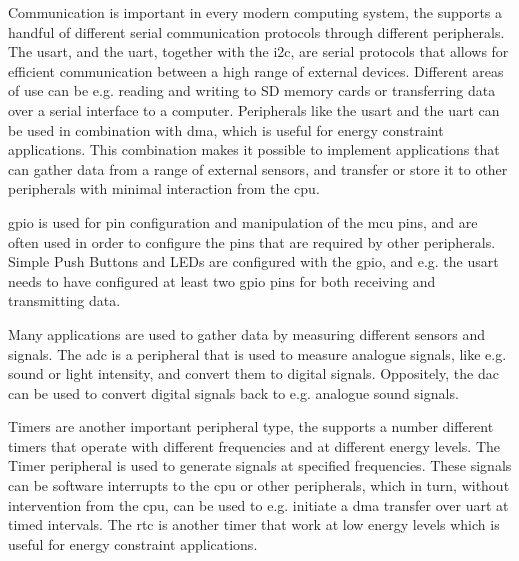 Communication is important in every modern computing system, the {\gecko} supports a handful of different serial communication protocols through different peripherals.
The \gls{usart}, and the \gls{uart}, together with the \gls{i2c}, are serial protocols that allows for efficient communication between a high range of external devices.
Different areas of use can be e.g. reading and writing to SD memory cards or transferring data over a serial interface to a computer.
Peripherals like the \gls{usart} and the \gls{uart} can be used in combination with \gls{dma}, which is useful for energy constraint applications.
This combination makes it possible to implement applications that can gather data from a range of external sensors, and transfer or store it to other peripherals with minimal interaction from the \gls{cpu}.

\gls{gpio} is used for pin configuration and manipulation of the \gls{mcu} pins, and are often used in order to configure the pins that are required by other peripherals.
Simple Push Buttons and LEDs are configured with the \gls{gpio}, and e.g. the \gls{usart} needs to have configured at least two \gls{gpio} pins for both receiving and transmitting data.

Many applications are used to gather data by measuring different sensors and signals.
The \gls{adc} is a peripheral that is used to measure analogue signals, like e.g. sound or light intensity, and convert them to digital signals.
Oppositely, the \gls{dac} can be used to convert digital signals back to e.g. analogue sound signals.

Timers are another important peripheral type, the {\gecko} supports a number different timers that operate with different frequencies and at different energy levels.
The Timer peripheral is used to generate signals at specified frequencies.
These signals can be software interrupts to the \gls{cpu} or other peripherals, which in turn, without intervention from the \gls{cpu}, can be used to e.g. initiate a \gls{dma} transfer over \gls{uart} at timed intervals.
The \gls{rtc} is another timer that work at low energy levels which is useful for energy constraint applications.
